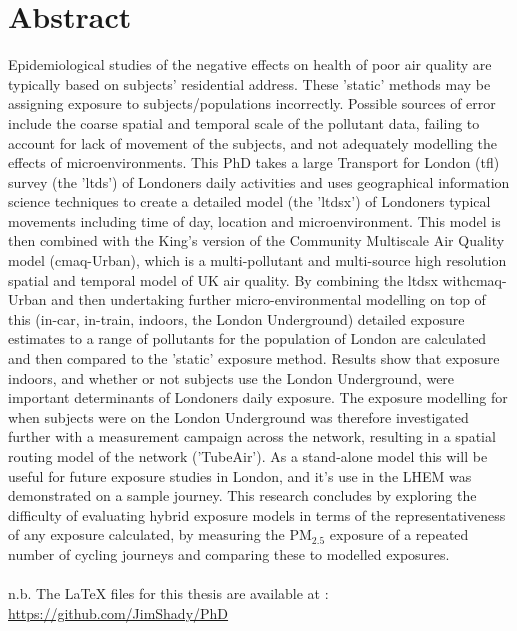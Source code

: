 \documentclass[12pt]{report}
\author{James D Smith, MSc, BA, PgCert, PgDip \vspace{2cm} \\ 
\multicolumn{1}{p{.7\textwidth}}{\centering Environmental Research Group, School of Analytical \& Environmental Sciences, Faculty of Life Sciences \& Medicine, King's College London}}
\date{Thesis submitted to King's College London in fulfillment of the requirements for the degree of Doctor of Philosophy \vspace{2cm} \\ 
December 2018}
\begin{document}
\maketitle

\chapter*{Abstract}

Epidemiological studies of the negative effects on health of poor air quality are typically based on subjects' residential address. These 'static' methods may be assigning exposure to subjects/populations incorrectly. Possible sources of error include the coarse spatial and temporal scale of the pollutant data, failing to account for lack of movement of the subjects, and not adequately modelling the effects of microenvironments. This PhD takes a large Transport for London (\gls{tfl}) survey (the '\gls{ltds}') of Londoners daily activities and uses geographical information science techniques to create a detailed model (the '\gls{ltdsx}') of Londoners typical movements including time of day, location and microenvironment. This model is then combined with the King’s version of the Community Multiscale Air Quality model (\gls{cmaq}-Urban), which is a multi-pollutant and multi-source high resolution spatial and temporal model of UK air quality. By combining the \gls{ltdsx} with\gls{cmaq}-Urban and then undertaking further micro-environmental modelling on top of this (in-car, in-train, indoors, the London Underground) detailed exposure estimates to a range of pollutants for the population of London are calculated and then compared to the 'static' exposure method. Results show that exposure indoors, and whether or not subjects use the London Underground, were important determinants of Londoners daily exposure. The exposure modelling for when subjects were on the London Underground was therefore investigated further with a measurement campaign across the network, resulting in a spatial routing model of the network ('TubeAir'). As a stand-alone model this will be useful for future exposure studies in London, and it’s use in the LHEM was demonstrated on a sample journey. This research concludes by exploring the difficulty of evaluating hybrid exposure models in terms of the representativeness of any exposure calculated, by measuring the PM$_{2.5}$ exposure of a repeated number of cycling journeys and comparing these to modelled exposures.
\\
\\
n.b. The LaTeX files for this thesis are available at : \url{https://github.com/JimShady/PhD}
\end{document}
